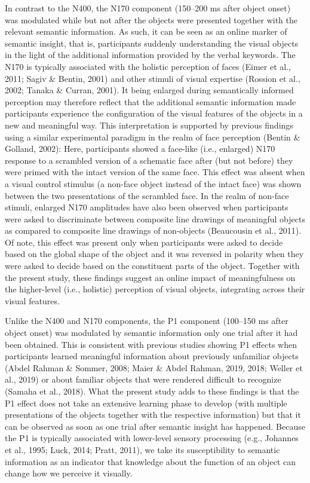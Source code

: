 \documentclass[
  english,
  man,floatsintext]{apa7}
\begin{document}
In contrast to the N400, the N170 component (150--200 ms after object onset) was modulated while but not after the objects were presented together with the relevant semantic information. As such, it can be seen as an online marker of semantic insight, that is, participants suddenly understanding the visual objects in the light of the additional information provided by the verbal keywords. The N170 is typically associated with the holistic perception of faces (Eimer et al., 2011; Sagiv \& Bentin, 2001) and other stimuli of visual expertise (Rossion et al., 2002; Tanaka \& Curran, 2001). It being enlarged during semantically informed perception may therefore reflect that the additional semantic information made participants experience the configuration of the visual features of the objects in a new and meaningful way. This interpretation is supported by previous findings using a similar experimental paradigm in the realm of face perception (Bentin \& Golland, 2002): Here, participants showed a face-like (i.e., enlarged) N170 response to a scrambled version of a schematic face after (but not before) they were primed with the intact version of the same face. This effect was absent when a visual control stimulus (a non-face object instead of the intact face) was shown between the two presentations of the scrambled face. In the realm of non-face stimuli, enlarged N170 amplitudes have also been observed when participants were asked to discriminate between composite line drawings of meaningful objects as compared to composite line drawings of non-objects (Beaucousin et al., 2011). Of note, this effect was present only when participants were asked to decide based on the global shape of the object and it was reversed in polarity when they were asked to decide based on the constituent parts of the object. Together with the present study, these findings suggest an online impact of meaningfulness on the higher-level (i.e., holistic) perception of visual objects, integrating across their visual features.

Unlike the N400 and N170 components, the P1 component (100--150 ms after object onset) was modulated by semantic information only one trial after it had been obtained. This is consistent with previous studies showing P1 effects when participants learned meaningful information about previously unfamiliar objects (Abdel Rahman \& Sommer, 2008; Maier \& Abdel Rahman, 2019, 2018; Weller et al., 2019) or about familiar objects that were rendered difficult to recognize (Samaha et al., 2018). What the present study adds to these findings is that the P1 effect does not take an extensive learning phase to develop (with multiple presentations of the objects together with the respective information) but that it can be observed as soon as one trial after semantic insight has happened. Because the P1 is typically associated with lower-level sensory processing (e.g., Johannes et al., 1995; Luck, 2014; Pratt, 2011), we take its susceptibility to semantic information as an indicator that knowledge about the function of an object can change how we perceive it visually.
\end{document}
